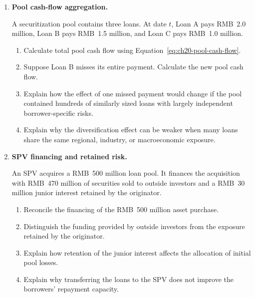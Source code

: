 \begin{enumerate}

\item \textbf{Pool cash-flow aggregation.}

A securitization pool contains three loans. At date \(t\), Loan A pays RMB~2.0 million, Loan B pays RMB~1.5 million, and Loan C pays RMB~1.0 million.

\begin{enumerate}

\item Calculate total pool cash flow using Equation~\eqref{eq:ch20-pool-cash-flow}.

\item Suppose Loan B misses its entire payment. Calculate the new pool cash flow.

\item Explain how the effect of one missed payment would change if the pool contained hundreds of similarly sized loans with largely independent borrower-specific risks.

\item Explain why the diversification effect can be weaker when many loans share the same regional, industry, or macroeconomic exposure.

\end{enumerate}


\item \textbf{SPV financing and retained risk.}

An SPV acquires a RMB~500 million loan pool. It finances the acquisition with RMB~470 million of securities sold to outside investors and a RMB~30 million junior interest retained by the originator.

\begin{enumerate}

\item Reconcile the financing of the RMB~500 million asset purchase.

\item Distinguish the funding provided by outside investors from the exposure retained by the originator.

\item Explain how retention of the junior interest affects the allocation of initial pool losses.

\item Explain why transferring the loans to the SPV does not improve the borrowers' repayment capacity.

\end{enumerate}



\end{enumerate}
